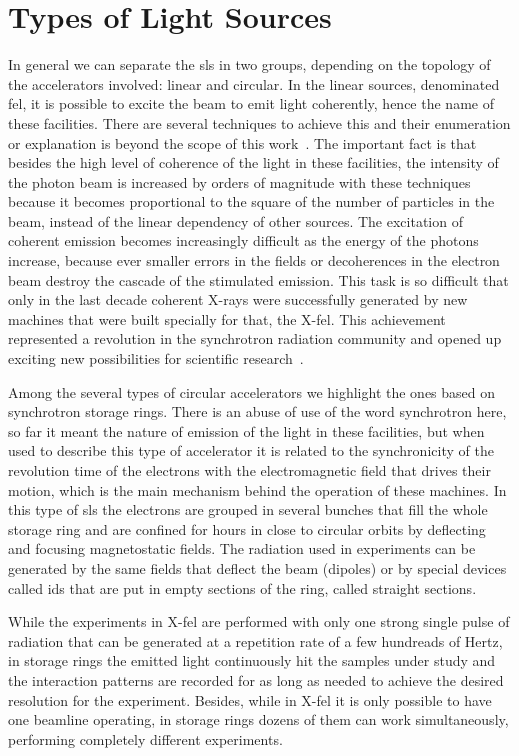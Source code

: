 \section{Types of Light Sources}

    In general we can separate the \gls{sls} in two groups, depending on the topology of the accelerators involved: linear and circular. In the linear sources, denominated \gls{fel}, it is possible to excite the beam to emit light coherently, hence the name of these facilities. There are several techniques to achieve this and their enumeration or explanation is beyond the scope of this work~\cite{saseref,other_methods}. The important fact is that besides the high level of coherence of the light in these facilities, the intensity of the photon beam is increased by orders of magnitude with these techniques because it becomes proportional to the square of the number of particles in the beam, instead of the linear dependency of other sources. The excitation of coherent emission becomes increasingly difficult as the energy of the photons increase, because ever smaller errors in the fields or decoherences in the electron beam destroy the cascade of the stimulated emission. This task is so difficult that only in the last decade coherent X-rays were successfully generated by new machines that were built specially for that, the X-\gls{fel}. This achievement represented a revolution in the synchrotron radiation community and opened up exciting new possibilities for scientific research~\cite{some,scientific,papers}.

    Among the several types of circular accelerators we highlight the ones based on synchrotron storage rings. There is an abuse of use of the word synchrotron here, so far it meant the nature of emission of the light in these facilities, but when used to describe this type of accelerator it is related to the synchronicity of the revolution time of the electrons with the electromagnetic field that drives their motion, which is the main mechanism behind the operation of these machines. In this type of \gls{sls} the electrons are grouped in several bunches that fill the whole storage ring and are confined for hours in close to circular orbits by deflecting and focusing magnetostatic fields. The radiation used in experiments can be generated by the same fields that deflect the beam (dipoles) or by special devices called \gls{ids} that are put in empty sections of the ring, called straight sections.

    While the experiments in X-\gls{fel} are performed with only one strong single pulse of radiation that can be generated at a repetition rate of a few hundreads of Hertz, in storage rings the emitted light continuously hit the samples under study and the interaction patterns are recorded for as long as needed to achieve the desired resolution for the experiment. Besides, while in X-\gls{fel} it is only possible to have one beamline operating, in storage rings dozens of them can work simultaneously, performing completely different experiments.

